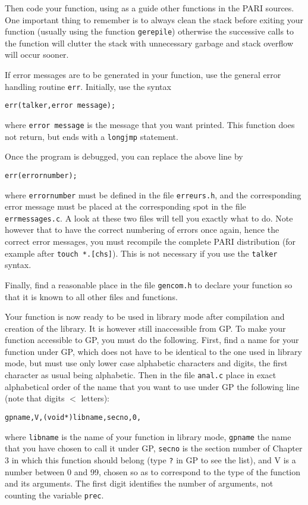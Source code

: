 Then code your function, using as a guide other functions in the PARI sources.
One important thing to remember is to always clean the stack before exiting
your function (usually using the function {\tt gerepile}) otherwise the 
successive calls to the function will clutter the stack with unnecessary
garbage and stack overflow will occur sooner.

If error messages are to be generated in your function, use the general
error handling routine {\tt err}. Initially, use the syntax

{\tt err(talker,\quo error message\quo);}

where {\tt error message} is the message that you want printed. This function
does not return, but ends with a {\tt longjmp} statement.

Once the program is debugged, you can replace the above line by

{\tt err(errornumber);} 

where {\tt errornumber} must be defined in the file {\tt erreurs.h}, and the
corresponding error message must be placed at the corresponding spot
in the file {\tt errmessages.c}. A look at these two files will tell you
exactly what to do. Note however that to have the correct numbering of errors
once again, hence the correct error messages, you must recompile the
complete PARI distribution (for example after {\tt touch *.[chs]}). This is
not necessary if you use the {\tt talker} syntax.

Finally, find a reasonable place in the file {\tt gencom.h} to declare your
function so that it is known to all other files and functions.

Your function is now ready to be used in library mode after compilation and
creation of the library. It is however still inaccessible from GP.
\smallskip
To make your function accessible to GP, you must do the following. First, find
a name for your function under GP, which does not have to be identical to the
one used in library mode, but must use only lower case alphabetic characters
and digits, the first character as usual being alphabetic. Then in the file
{\tt anal.c} place in exact alphabetical order of the name that you want
to use under GP the following line (note that digits $<$ letters):

{\tt \obr\quo gpname\quo ,V,(void*)libname,secno,0\cbr,}

where {\tt libname} is the name of your function in library mode, {\tt gpname}
the name that you have chosen to call it under GP, {\tt secno} is the section
number of Chapter 3 in which this function should belong (type {\tt ?} in GP
to see the list), and V is a number between
0 and 99, chosen so as to correspond to the type of the function and its 
arguments. The first digit identifies the number of arguments, not counting
the variable {\tt prec}.

